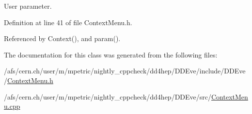 User parameter. 

Definition at line 41 of file ContextMenu.h.

Referenced by Context(), and param().

The documentation for this class was generated from the following files:\begin{DoxyCompactItemize}
\item 
/afs/cern.ch/user/m/mpetric/nightly\_\-cppcheck/dd4hep/DDEve/include/DDEve/\hyperlink{_context_menu_8h}{ContextMenu.h}\item 
/afs/cern.ch/user/m/mpetric/nightly\_\-cppcheck/dd4hep/DDEve/src/\hyperlink{_context_menu_8cpp}{ContextMenu.cpp}\end{DoxyCompactItemize}
